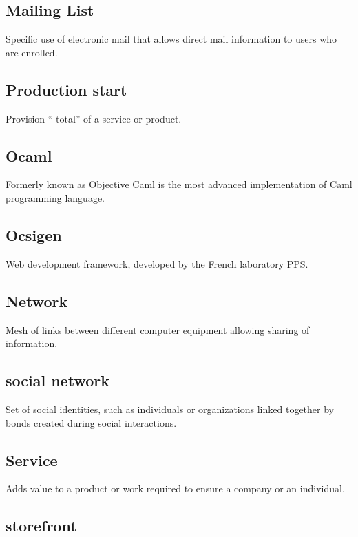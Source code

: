 \documentclass{life-fr}
\begin{document}
\subsection {Mailing List}

Specific use of electronic mail that allows direct mail information to users who are enrolled.

\subsection {Production start}

Provision `` total'' of a service or product.

\subsection {Ocaml}

Formerly known as Objective Caml is the most advanced implementation of Caml programming language.

\subsection {Ocsigen}

Web development framework, developed by the French laboratory PPS.

\subsection {Network}

Mesh of links between different computer equipment allowing sharing of information.

\subsection {social network}

Set of social identities, such as individuals or organizations linked together by bonds created during social interactions.

\subsection {Service}

Adds value to a product or work required to ensure a company or an individual.

\subsection {storefront}
\end{document}
